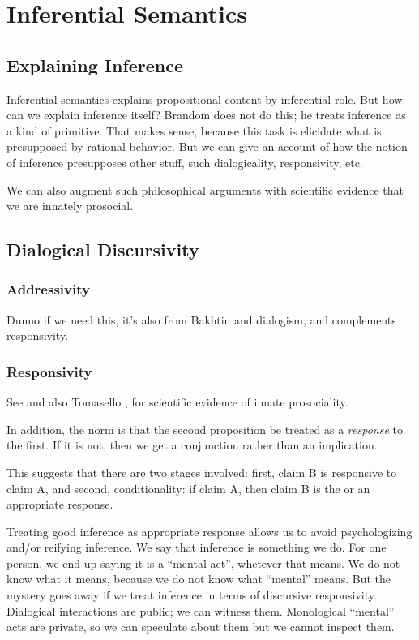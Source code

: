 \section{Inferential Semantics}\label{sec:isemantics}

\subsection{Explaining Inference}

Inferential semantics explains propositional content by inferential
role. But how can we explain inference itself? Brandom does not do
this; he treats inference as a kind of primitive. That makes sense,
because this task is elicidate what is presupposed by rational
behavior. But we can give an account of how the notion of inference
presupposes other stuff, such dialogicality, responsivity, etc.

We can also augment such philosophical arguments with scientific
evidence that we are innately prosocial.

\subsection{Dialogical Discursivity}

\subsubsection{Addressivity}

Dunno if we need this, it's also from Bakhtin and dialogism, and
complements responsivity.

\subsubsection{Responsivity}

See \parencite{bakhtin_problem_1986} and also Tomasello
\parencite{tomasello2009we}, \parencite{tomasello_origins_2010} for
scientific evidence of innate prosociality.

In addition, the norm is that the second proposition be treated as a
\textit{response} to the first. If it is not, then we get a
conjunction rather than an implication.

This suggests that there are two stages involved: first, claim B is
responsive to claim A, and second, conditionality: if claim A, then
claim B is the or an appropriate response.

Treating good inference as appropriate response allows us to avoid
psychologizing and/or reifying inference. We say that inference is
something we do. For one person, we end up saying it is a ``mental
act'', whetever that means. We do not know what it means, because we
do not know what ``mental'' means. But the mystery goes away if we
treat inference in terms of discursive responsivity. Dialogical
interactions are public; we can witness them. Monological ``mental''
acts are private, so we can speculate about them but we cannot inspect
them.


